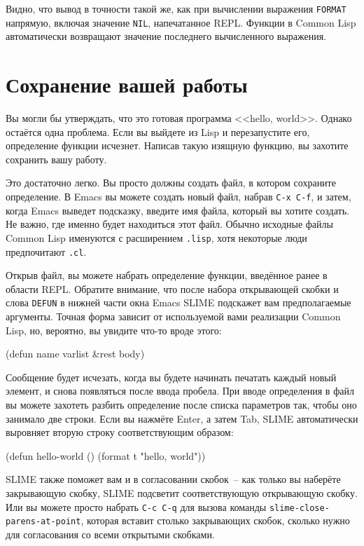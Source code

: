 Видно, что вывод в точности такой же, как при вычислении выражения \lstinline{FORMAT}
напрямую, включая значение \lstinline{NIL}, напечатанное REPL. Функции в Common Lisp автоматически
возвращают значение последнего вычисленного выражения.

\section{Сохранение вашей работы}

Вы могли бы утверждать, что это готовая программа <<hello, world>>. Однако остаётся одна
проблема. Если вы выйдете из Lisp и перезапустите его, определение функции
исчезнет. Написав такую изящную функцию, вы захотите сохранить вашу работу.

Это достаточно легко. Вы просто должны создать файл, в котором сохраните определение. В
Emacs вы можете создать новый файл, набрав \texttt{C-x C-f}, и затем, когда Emacs выведет подсказку,
введите имя файла, который вы хотите создать. Не важно, где именно будет находиться этот
файл. Обычно исходные файлы Common Lisp именуются с расширением \texttt{.lisp}, хотя некоторые люди
предпочитают \texttt{.cl}.

Открыв файл, вы можете набрать определение функции, введённое ранее в области
REPL. Обратите внимание, что после набора открывающей скобки и слова \lstinline{DEFUN} в нижней части
окна Emacs SLIME подскажет вам предполагаемые аргументы. Точная форма зависит от
используемой вами реализации Common Lisp, но, вероятно, вы увидите что-то вроде этого:

\begin{myverb}
(defun name varlist &rest body)
\end{myverb}

Сообщение будет исчезать, когда вы будете начинать печатать каждый новый элемент, и снова
появляться после ввода пробела. При вводе определения в файл вы можете захотеть разбить
определение после списка параметров так, чтобы оно занимало две строки. Если вы нажмёте
Enter, а затем Tab, SLIME автоматически выровняет вторую строку соответствующим
образом:

\begin{myverb}
(defun hello-world ()
  (format t "hello, world"))
\end{myverb}

SLIME также поможет вам и в согласовании скобок~-- как только вы наберёте закрывающую
скобку, SLIME подсветит соответствующую открывающую скобку. Или вы можете просто набрать
\texttt{C-c C-q} для вызова команды \texttt{slime-close-parens-at-point}, которая вставит столько
закрывающих скобок, сколько нужно для согласования со всеми открытыми скобками.

